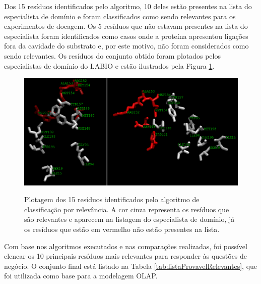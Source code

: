 \begin{itemize}
Dos 15 resíduos identificados pelo algoritmo, 10 deles estão presentes na lista do especialista de domínio e foram classificados como sendo relevantes para os experimentos de docagem. Os 5 resíduos que não estavam presentes na lista do especialista foram identificados como casos onde a proteína apresentou ligações fora da cavidade do substrato e, por este motivo, não foram considerados como sendo relevantes. Os resíduos do conjunto obtido foram plotados pelos especialistas de domínio do LABIO e estão ilustrados pela Figura \ref{fig:PlotResiduos}. 

\begin{figure}[h]
        \center
        \includegraphics[scale=0.55]{images/avaliacao_Residuos_nomes.png}
        \label{fig:PlotResiduos}
        \caption{Plotagem dos 15 resíduos identificados pelo algoritmo de classificação por relevância. A cor cinza representa os resíduos que são relevantes e aparecem na listagem do especialista de domínio, já os resíduos que estão em vermelho não estão presentes na lista.}
\end{figure}

Com base nos algoritmos executados e nas comparações realizadas, foi possível elencar os 10 principais resíduos mais relevantes para responder às questões de negócio. O conjunto final está listado na Tabela \ref{tab:listaProvavelRelevantes}, que foi utilizada como base para a modelagem OLAP.


\end{itemize}
